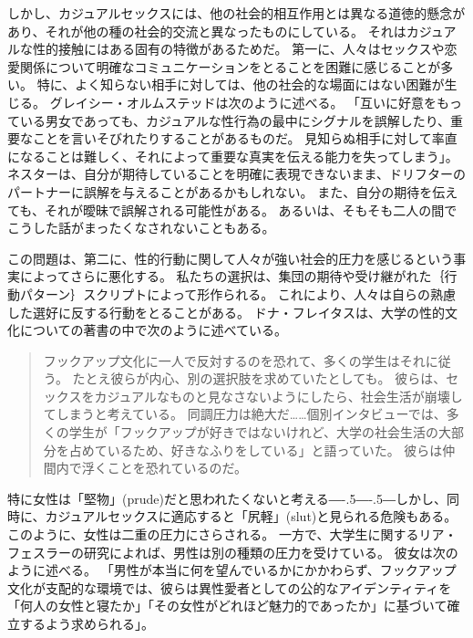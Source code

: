 \documentclass[paper=a4,book,openany]{jlreq}
\def\DDASH{―\kern-.5\zw―\kern-.5\zw―} %
\begin{document}
しかし、カジュアルセックスには、他の社会的相互作用とは異なる道徳的懸念があり、それが他の種の社会的交流と異なったものにしている。
それはカジュアルな性的接触にはある固有の特徴があるためだ。
第一に、人々はセックスや恋愛関係について明確なコミュニケーションをとることを困難に感じることが多い。
特に、よく知らない相手に対しては、他の社会的な場面にはない困難が生じる。
グレイシー・オルムステッドは次のように述べる。
「互いに好意をもっている男女であっても、カジュアルな性行為の最中にシグナルを誤解したり、重要なことを言いそびれたりすることがあるものだ。
見知らぬ相手に対して率直になることは難しく、それによって重要な真実を伝える能力を失ってしまう」\citep{olmstead18:_divor_sex_love}。
ネスターは、自分が期待していることを明確に表現できないまま、ドリフターのパートナーに誤解を与えることがあるかもしれない。
また、自分の期待を伝えても、それが曖昧で誤解される可能性がある。
あるいは、そもそも二人の間でこうした話がまったくなされないこともある。

この問題は、第二に、性的行動に関して人々が強い社会的圧力を感じるという事実によってさらに悪化する。
私たちの選択は、集団の期待や受け継がれた｛行動パターン｝{スクリプト}によって形作られる。
これにより、人々は自らの熟慮した選好に反する行動をとることがある。
ドナ・フレイタスは、大学の性的文化についての著書の中で次のように述べている。

\begin{quote}
  フックアップ文化に一人で反対するのを恐れて、多くの学生はそれに従う。
たとえ彼らが内心、別の選択肢を求めていたとしても。
彼らは、セックスをカジュアルなものと見なさないようにしたら、社会生活が崩壊してしまうと考えている。
同調圧力は絶大だ……個別インタビューでは、多くの学生が「フックアップが好きではないけれど、大学の社会生活の大部分を占めているため、好きなふりをしている」と語っていた。
彼らは仲間内で浮くことを恐れているのだ。
\citep{freitas13:_time_stop_hook_up}

\end{quote}

特に女性は「堅物」(prude)だと思われたくないと考える{\DDASH}しかし、同時に、カジュアルセックスに適応すると「尻軽」(slut)と見られる危険もある。
このように、女性は二重の圧力にさらされる。
一方で、大学生に関するリア・フェスラーの研究によれば、男性は別の種類の圧力を受けている。
彼女は次のように述べる。
「男性が本当に何を望んでいるかにかかわらず、フックアップ文化が支配的な環境では、彼らは異性愛者としての公的なアイデンティティを「何人の女性と寝たか」「その女性がどれほど魅力的であったか」に基づいて確立するよう求められる」\citep{fessler16:_lot_women_dont}。
\end{document}
